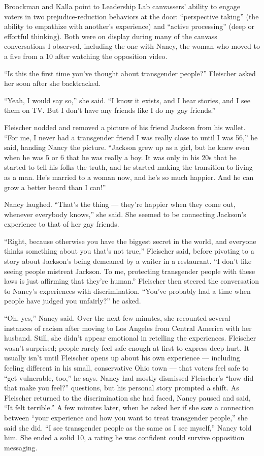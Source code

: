Broockman and Kalla point to Leadership Lab canvassers' ability to
engage voters in two prejudice-reduction behaviors at the door:
``perspective taking'' (the ability to empathize with another's
experience) and ``active processing'' (deep or effortful thinking). Both
were on display during many of the canvass conversations I observed,
including the one with Nancy, the woman who moved to a five from a 10
after watching the opposition video.

``Is this the first time you've thought about transgender people?''
Fleischer asked her soon after she backtracked.

``Yeah, I would say so,'' she said. ``I know it exists, and I hear
stories, and I see them on TV. But I don't have any friends like I do my
gay friends.''

Fleischer nodded and removed a picture of his friend Jackson from his
wallet. ``For me, I never had a transgender friend I was really close to
until I was 56,'' he said, handing Nancy the picture. ``Jackson grew up
as a girl, but he knew even when he was 5 or 6 that he was really a boy.
It was only in his 20s that he started to tell his folks the truth, and
he started making the transition to living as a man. He's married to a
woman now, and he's so much happier. And he can grow a better beard than
I can!''

Nancy laughed. ``That's the thing --- they're happier when they come
out, whenever everybody knows,'' she said. She seemed to be connecting
Jackson's experience to that of her gay friends.

``Right, because otherwise you have the biggest secret in the world, and
everyone thinks something about you that's not true,'' Fleischer said,
before pivoting to a story about Jackson's being demeaned by a waiter in
a restaurant. ``I don't like seeing people mistreat Jackson. To me,
protecting transgender people with these laws is just affirming that
they're human.'' Fleischer then steered the conversation to Nancy's
experiences with discrimination. ``You've probably had a time when
people have judged you unfairly?'' he asked.

``Oh, yes,'' Nancy said. Over the next few minutes, she recounted
several instances of racism after moving to Los Angeles from Central
America with her husband. Still, she didn't appear emotional in
retelling the experiences. Fleischer wasn't surprised; people rarely
feel safe enough at first to express deep hurt. It usually isn't until
Fleischer opens up about his own experience --- including feeling
different in his small, conservative Ohio town --- that voters feel safe
to ``get vulnerable, too,'' he says. Nancy had mostly dismissed
Fleischer's ``how did that make you feel?'' questions, but his personal
story prompted a shift. As Fleischer returned to the discrimination she
had faced, Nancy paused and said, ``It felt terrible.'' A few minutes
later, when he asked her if she saw a connection between ``your
experience and how you want to treat transgender people,'' she said she
did. ``I see transgender people as the same as I see myself,'' Nancy
told him. She ended a solid 10, a rating he was confident could survive
opposition messaging.

